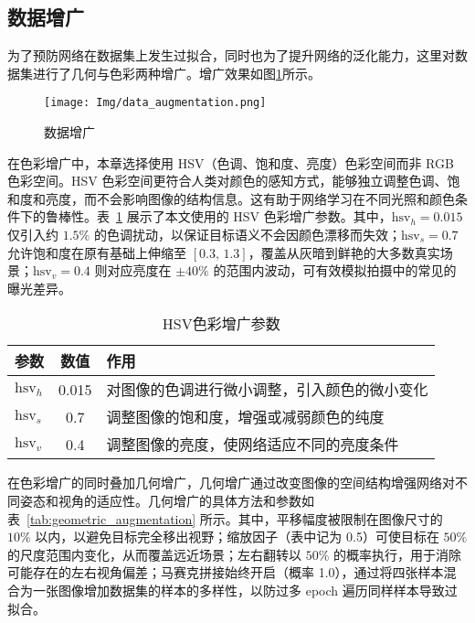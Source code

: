 \subsection{数据增广}
为了预防网络在数据集上发生过拟合，同时也为了提升网络的泛化能力，这里对数据集进行了几何与色彩两种增广。增广效果如图\ref{fig:data_augmentation}所示。
\begin{figure}[htbp]
	\centering
	\texttt{[image: Img/data\_augmentation.png]}
	\caption{数据增广}
	\label{fig:data_augmentation}
\end{figure}

在色彩增广中，本章选择使用 HSV（色调、饱和度、亮度）色彩空间而非 RGB 色彩空间。HSV 色彩空间更符合人类对颜色的感知方式，能够独立调整色调、饱和度和亮度，而不会影响图像的结构信息。这有助于网络学习在不同光照和颜色条件下的鲁棒性。表~\ref{tab:hsv_augmentation} 展示了本文使用的 HSV 色彩增广参数。其中，\(\mathrm{hsv}_h = 0.015\) 仅引入约 \(1.5\%\) 的色调扰动，以保证目标语义不会因颜色漂移而失效；\(\mathrm{hsv}_s = 0.7\) 允许饱和度在原有基础上伸缩至 \([0.3,\,1.3]\)，覆盖从灰暗到鲜艳的大多数真实场景；\(\mathrm{hsv}_v = 0.4\) 则对应亮度在 \(\pm40\%\) 的范围内波动，可有效模拟拍摄中的常见的曝光差异。

\begin{table}[htbp]
	\centering
	\caption{HSV色彩增广参数}
	\label{tab:hsv_augmentation}
	\begin{tabular}{lcp{8cm}}
		\toprule[1.5pt]
		参数 & 数值 & 作用 \\
		\midrule[1pt]
		$\mathrm{hsv}_h$ & 0.015 & 对图像的色调进行微小调整，引入颜色的微小变化 \\
		$\mathrm{hsv}_s$ & 0.7 & 调整图像的饱和度，增强或减弱颜色的纯度 \\
		$\mathrm{hsv}_v$ & 0.4 & 调整图像的亮度，使网络适应不同的亮度条件 \\
		\bottomrule[1.5pt]
	\end{tabular}
\end{table}

在色彩增广的同时叠加几何增广，几何增广通过改变图像的空间结构增强网络对不同姿态和视角的适应性。几何增广的具体方法和参数如表~\ref{tab:geometric_augmentation} 所示。其中，平移幅度被限制在图像尺寸的 \(10\%\) 以内，以避免目标完全移出视野；缩放因子（表中记为 0.5）可使目标在 \(50\%\) 的尺度范围内变化，从而覆盖远近场景；左右翻转以 \(50\%\) 的概率执行，用于消除可能存在的左右视角偏差；马赛克拼接始终开启（概率 1.0），通过将四张样本混合为一张图像增加数据集的样本的多样性，以防过多 epoch 遍历同样样本导致过拟合。

